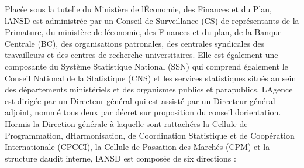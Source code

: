 \documentclass[
  letterpaper,
  DIV=11,
  numbers=noendperiod]{scrartcl}
\begin{document}
Placée sous la tutelle du Ministère de l\textquotesingle Économie, des
Finances et du Plan, l\textquotesingle ANSD est administrée par un
Conseil de Surveillance (CS) de représentants de la Primature, du
ministère de l\textquotesingle économie, des Finances et du plan, de la
Banque Centrale (BC), des organisations patronales, des centrales
syndicales des travailleurs et des centres de recherche universitaires.
Elle est également une composante du Système Statistique National (SSN)
qui comprend également le Conseil National de la Statistique (CNS) et
les services statistiques situés au sein des départements ministériels
et des organismes publics et parapublics. L\textquotesingle Agence est
dirigée par un Directeur général qui est assisté par un Directeur
général adjoint, nommé tous deux par décret sur proposition du conseil
d\textquotesingle orientation. Hormis la Direction générale à laquelle
sont rattachées la Cellule de Programmation,
d\textquotesingle Harmonisation, de Coordination Statistique et de
Coopération Internationale (CPCCI), la Cellule de Passation des Marchés
(CPM) et la structure d\textquotesingle audit interne,
l\textquotesingle ANSD est composée de six directions :
\end{document}
